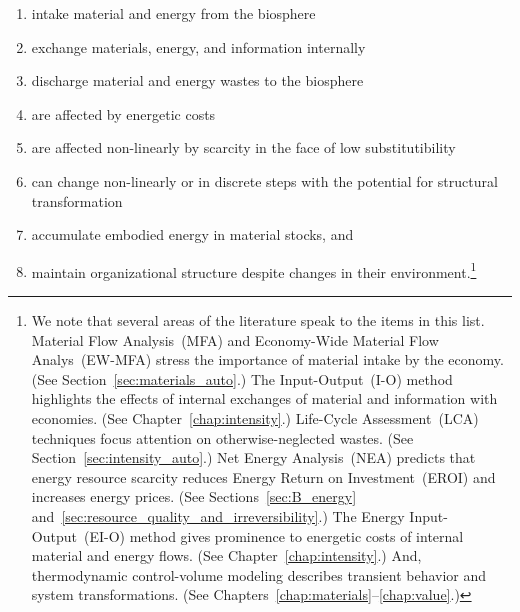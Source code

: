 \begin{enumerate}
	\item{\label{itm:intake}intake material and energy from the biosphere}
	\item{\label{itm:internal_exchange}exchange materials, energy, and information internally}
	\item{\label{itm:discharge}discharge material and energy wastes to the biosphere}
	\item{\label{itm:energetic_costs}are affected by energetic costs}
	\item{\label{itm:scarcity}are affected non-linearly by scarcity 
			in the face of low substitutibility}
	\item{\label{itm:non-linear}can change non-linearly or in discrete steps with the potential 
			for structural transformation}
	\item{\label{itm:embodies}accumulate embodied energy in material stocks, and}
	\item{\label{itm:robust}maintain organizational structure despite changes 
			in their environment.\footnote{We note that 
				several areas of the literature speak to the items in this list.
				Material Flow Analysis~(MFA) and 
				Economy-Wide Material Flow Analys~(EW-MFA)
				stress the importance of
				material intake by the economy. 
				(See Section~\ref{sec:materials_auto}.)
				The Input-Output~(I-O) method highlights the effects of internal exchanges
				of material and information with economies. 
				(See Chapter~\ref{chap:intensity}.)
				Life-Cycle Assessment~(LCA) techniques focus attention 
				on otherwise-neglected wastes. 
				(See Section~\ref{sec:intensity_auto}.)
				Net Energy Analysis~(NEA) predicts that energy resource 
				scarcity reduces Energy Return on Investment~(EROI)
				and increases energy prices.
				(See Sections~\ref{sec:B_energy} 
				and~\ref{sec:resource_quality_and_irreversibility}.)
				The Energy Input-Output~(EI-O) method gives prominence to energetic costs
				of internal material and energy flows.
				(See Chapter~\ref{chap:intensity}.)
				And, thermodynamic control-volume modeling describes
				transient behavior and system transformations.
				(See Chapters~\ref{chap:materials}--\ref{chap:value}.)
			}}
\end{enumerate}

